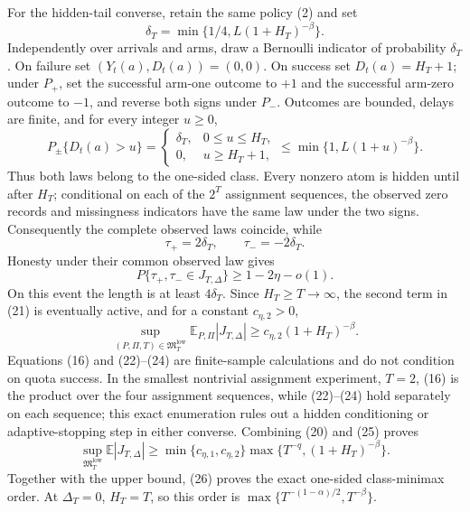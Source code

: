 For the hidden-tail converse, retain the same policy (2) and set
\[
 \delta_T=\min\{1/4,L(1+H_T)^{-\beta}\}.
 \tag{21}
\]
Independently over arrivals and arms, draw a Bernoulli indicator of probability \(\delta_T\).  On failure set \((Y_t(a),D_t(a))=(0,0)\).  On success set \(D_t(a)=H_T+1\); under \(P_+\), set the successful arm-one outcome to \(+1\) and the successful arm-zero outcome to \(-1\), and reverse both signs under \(P_-\).  Outcomes are bounded, delays are finite, and for every integer \(u\geq0\),
\[
 P_\pm\{D_t(a)>u\}
 =\begin{cases}
 \delta_T,&0\leq u\leq H_T,\\
 0,&u\geq H_T+1,
 \end{cases}
 \leq\min\{1,L(1+u)^{-\beta}\}.
 \tag{22}
\]
Thus both laws belong to the one-sided class.  Every nonzero atom is hidden until after \(H_T\); conditional on each of the \(2^T\) assignment sequences, the observed zero records and missingness indicators have the same law under the two signs.  Consequently the complete observed laws coincide, while
\[
 \tau_+=2\delta_T,
 \qquad \tau_-=-2\delta_T.
 \tag{23}
\]
Honesty under their common observed law gives
\[
 P\{\tau_+,\tau_-\in J_{T,\Delta}\}
 \geq1-2\eta-o(1).
 \tag{24}
\]
On this event the length is at least \(4\delta_T\).  Since \(H_T\geq T\to\infty\), the second term in (21) is eventually active, and for a constant \(c_{\eta,2}>0\),
\[
 \sup_{(P,\Pi,T)\in\mathfrak M_T^{\mathrm{low}}}
 \mathbb E_{P,\Pi}|J_{T,\Delta}|
 \geq c_{\eta,2}(1+H_T)^{-\beta}.
 \tag{25}
\]
Equations (16) and (22)--(24) are finite-sample calculations and do not condition on quota success.  In the smallest nontrivial assignment experiment, \(T=2\), (16) is the product over the four assignment sequences, while (22)--(24) hold separately on each sequence; this exact enumeration rules out a hidden conditioning or adaptive-stopping step in either converse.  Combining (20) and (25) proves
\[
 \sup_{\mathfrak M_T^{\mathrm{low}}}\mathbb E|J_{T,\Delta}|
 \geq\min\{c_{\eta,1},c_{\eta,2}\}
 \max\{T^{-q},(1+H_T)^{-\beta}\}.
 \tag{26}
\]
Together with the upper bound, (26) proves the exact one-sided class-minimax order.  At \(\Delta_T=0\), \(H_T=T\), so this order is \(\max\{T^{-(1-\alpha)/2},T^{-\beta}\}\).

